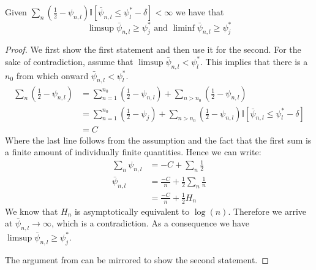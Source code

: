 \textbf{}
Given $\sum_n(\frac{1}{2} - \psi_{n, l}) \mathbb{I}[\bar{\psi}_{n, l} \leq
  \psi_l^* - \delta] < \infty$ we have that
\[\limsup \bar{\psi}_{n, l} \geq \psi_j^* \text{ and } \liminf \bar{\psi}_{n,
    l} \geq \psi_j^*\]
\begin{proof}
  We first show the first statement and then use it for the second. For the
  sake of contradiction, assume that $\limsup \bar{\psi}_{n, l} <
  \psi_l^*$. This implies that there is a $n_0$ from which onward
  $\bar{\psi}_{n, l} < \psi_l^*$.
  \begin{align}
    \sum_n (\frac{1}{2} - \psi_{n, l}) &= \sum_{n=1}^{n_0} (\frac{1}{2} -
          \psi_{n, l}) + \sum_{n > n_0} (\frac{1}{2} - \psi_{n, l}) \\
      &= \sum_{n=1}^{n_0} (\frac{1}{2} - \psi_j) + \sum_{n > n_0}
          (\frac{1}{2} - \psi_{n, l})\mathbb{I}[\bar{\psi}_{n, l} \leq
          \psi_l^* - \delta] \\
      &= C
  \end{align}
  Where the last line follows from the assumption and the fact that the first
  sum is a finite amount of individually finite quantities. Hence we can
  write:
  \begin{align}
    \sum_n \psi_{n, l} &= -C + \sum_n \frac{1}{2} \\
    \bar{\psi}_{n, l} &= \frac{-C}{n} + \frac{1}{2}\sum_n\frac{1}{n} \\
      &= \frac{-C}{n} + \frac{1}{2} H_n
  \end{align}
  We know that $H_n$ is asymptotically equivalent to $\log(n)$. Therefore we
  arrive at $\bar{\psi}_{n, l} \rightarrow \infty$, which is a contradiction.
  As a consequence we have $\limsup \bar{\psi}_{n, l} \geq \psi_j^*$.

  The argument from  can be
  mirrored to show the second statement.
\end{proof}

